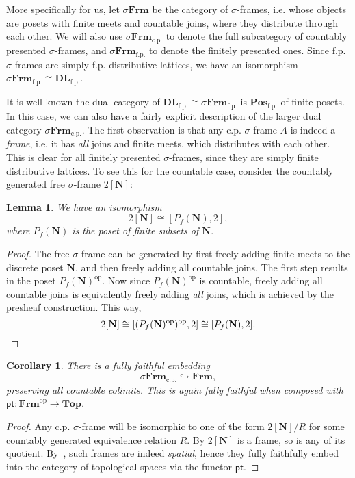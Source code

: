 \documentclass[12pt]{amsart}
\newtheorem{lemma}[theorem]{Lemma}
\newtheorem{corollary}[theorem]{Corollary}
\theoremstyle{definition}
\newcommand{\mb}[1]{\mathbf{#1}}
\newcommand{\mr}[1]{\mathrm{#1}}
\newcommand{\ms}[1]{\mathsf{#1}}
\newcommand{\Pos}{\mb{Pos}}
\newcommand{\DL}{\mb{DL}}
\newcommand{\op}{^{\mathrm{op}}}
\newcommand{\hook}{\hookrightarrow}
\newcommand{\fp}{_{\mr{f.p.}}}
\newcommand{\cp}{_{\mr{c.p.}}}
\newcommand{\N}{\mb N}
\newcommand{\pt}{\ms{pt}}
\newcommand{\sFrm}{\sigma\mb{Frm}}
\newcommand{\Frm}{\mb{Frm}}
\newcommand{\Topp}{\mb{Top}}
\begin{document}
More specifically for us, let $\sFrm$ be the category of $\sigma$-frames, i.e. whose objects are posets with finite meets and countable joins, where they distribute through each other. We will also use $\sFrm\cp$ to denote the full subcategory of countably presented $\sigma$-frames, and $\sFrm\fp$ to denote the finitely presented ones. Since f.p. $\sigma$-frames are simply f.p. distributive lattices, we have an isomorphism $\sFrm\fp \cong \DL\fp$.

It is well-known the dual category of $\DL\fp \cong \sFrm\fp$ is $\Pos\fp$ of finite posets. In this case, we can also have a fairly explicit description of the larger dual category $\sFrm\cp$. The first observation is that any c.p. $\sigma$-frame $A$ is indeed a \emph{frame}, i.e. it has \emph{all} joins and finite meets, which distributes with each other. This is clear for all finitely presented $\sigma$-frames, since they are simply finite distributive lattices. To see this for the countable case, consider the countably generated free $\sigma$-frame $2[\N]$:

\begin{lemma}\label{lem:cgfreesframe}
  We have an isomorphism
  \[ 2[\N] \cong [P_f(\N),2], \]
  where $P_f(\N)$ is the poset of finite subsets of $\N$.
\end{lemma}
\begin{proof}
  The free $\sigma$-frame can be generated by first freely adding finite meets to the discrete poset $\N$, and then freely adding all countable joins. The first step results in the poset $P_f(\N)\op$. Now since $P_f(\N)\op$ is countable, freely adding all countable joins is equivalently freely adding \emph{all} joins, which is achieved by the presheaf construction. This way,
  \[ 2[\N] \cong [(P_f(\N)\op)\op,2] \cong [P_f(\N),2]. \qedhere \]
\end{proof}

\begin{corollary}\label{cor:dualsframe}
  There is a fully faithful embedding
  \[ \sFrm\cp \hook \Frm, \]
  preserving all countable colimits. This is again fully faithful when composed with $\ms{pt} : \Frm\op \to \Topp$. 
\end{corollary}
\begin{proof}
  Any c.p. $\sigma$-frame will be isomorphic to one of the form $2[\N]/R$ for some countably generated equivalence relation $R$. By  $2[\N]$ is a frame, so is any of its quotient. By~\cite[Thm. 6.2.4]{makkai2006first}, such frames are indeed \emph{spatial}, hence they fully faithfully embed into the category of topological spaces via the functor $\pt$.
\end{proof}
\end{document}
